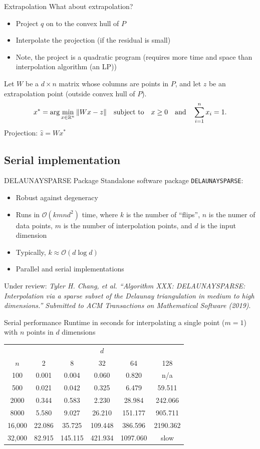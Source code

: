 \documentclass[xcolor=dvipsnames]{beamer}
\begin{document}
\begin{frame}{Extrapolation}
What about extrapolation?
\begin{itemize}
\item Project $q$ on to the convex hull of $P$
\item Interpolate the projection (if the residual is small)
\item Note, the project is a quadratic program (requires more time and
space than interpolation algorithm (an LP))
\end{itemize}
Let $W$ be a $d\times n$ matrix whose columns are points in $P$, and let
$z$ be an extrapolation point (outside convex hull of $P$).
$$
x^* = \arg\min_{x\in\mathbb{R}^n} \|Wx - z\| \quad\hbox{subject to}\quad
x \ge 0 \quad\hbox{and}\quad \sum_{i=1}^n x_i = 1.
$$
Projection: ${\hat z} = Wx^*$
\end{frame}
\subsection{Serial implementation}
\begin{frame}{DELAUNAYSPARSE Package}
Standalone software package {\tt DELAUNAYSPARSE}:
\begin{itemize}
\item Robust against degeneracy
\item Runs in $\mathcal{O}(k m n d^2)$ time, where $k$ is the
number of ``flips'', $n$ is the numer of data points, $m$ is the number of
interpolation points, and $d$ is the input dimension
\item Typically, $k \approx \mathcal{O}(d\log d)$
\item Parallel and serial implementations
\end{itemize}
Under review:
{\small \it Tyler H. Chang, et al.
``Algorithm XXX: DELAUNAYSPARSE: Interpolation via a sparse subset of the
Delaunay triangulation in medium to high dimensions.''
Submitted to ACM Transactions on Mathematical Software (2019)}. 
\end{frame}
\begin{frame}{Serial performance}
Runtime in seconds for interpolating a single point ($m=1$) with $n$ points
in $d$ dimensions\\
\bigskip
\medskip
\begin{tabular}{c|ccccc}
& & & $d$ & & \\
$n$ & 2 & 8 & 32 & 64 & 128 \\
\hline
100 & 0.001 & 0.004 & 0.060 & 0.820 & n/a \\
500 & 0.021 & 0.042 & 0.325 & 6.479 & 59.511 \\
2000 & 0.344 & 0.583 & 2.230 & 28.984 & 242.066 \\
8000 & 5.580 & 9.027 & 26.210 & 151.177 & 905.711 \\
16,000 & 22.086 & 35.725 & 109.448  & 386.596  & 2190.362 \\
32,000 & 82.915 & 145.115 & 421.934 & 1097.060 & slow \\
\end{tabular}
\end{frame}
\end{document}
